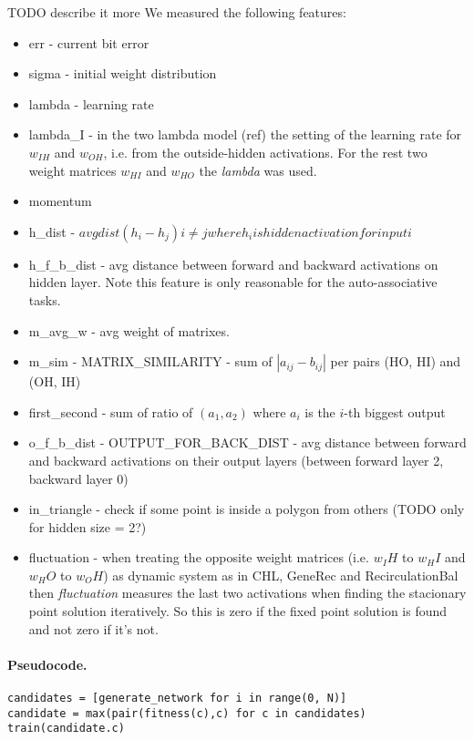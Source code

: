 TODO describe it more
We measured the following features: 
\begin{itemize} 
\item err - current bit error 
\item sigma - initial weight distribution 
\item lambda - learning rate 
\item lambda\_I - in the two lambda model (ref) the setting of the learning rate for $w_{IH}$ and $w_{OH}$, i.e. from the outside-hidden activations. For the rest two weight matrices $w_{HI}$ and $w_{HO}$ the \emph{lambda} was used. 
\item momentum
\item h\_dist - $avg dist(h_i - h_j) i \neq j where h_i is   hidden activation for input i$
\item h\_f\_b\_dist - avg distance between forward and backward activations on hidden layer. Note this feature is only reasonable for the auto-associative tasks. 
\item m\_avg\_w - avg weight of matrixes. 
\item m\_sim - MATRIX\_SIMILARITY - sum of $|a_{ij} - b_{ij}|$ per pairs (HO, HI) and (OH, IH) 
\item first\_second - sum of ratio of $(a_1, a_2)$ where $a_i$ is the $i$-th biggest output 
\item	o\_f\_b\_dist - OUTPUT\_FOR\_BACK\_DIST - avg distance between forward and backward activations on their output layers (between forward layer 2, backward layer 0) 
\item in\_triangle - check if some point is inside a polygon from others (TODO only for hidden size = 2?)
\item fluctuation - when treating the opposite weight matrices (i.e. $w_IH$ to $w_HI$ and $w_HO$ to $w_OH$) as dynamic system as in CHL, GeneRec and RecirculationBal then \emph{fluctuation} measures the last two activations when finding the stacionary point solution iteratively. So this is zero if the fixed point solution is found and not zero if it's not. 


\end{itemize} 

\paragraph{Pseudocode.} 
\begin{lstlisting} 
candidates = [generate_network for i in range(0, N)] 
candidate = max(pair(fitness(c),c) for c in candidates) 
train(candidate.c) 
\end{lstlisting} 


